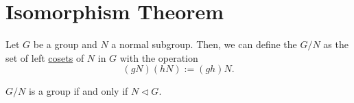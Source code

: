 \section{Isomorphism Theorem}

\begin{definition}\label{def:quotient-group}
    Let $G$ be a group and $N$ a normal subgroup. Then, we can define the  $G/N$ as the set of left \hyperref[def:coset]{cosets} of $N$ in $G$ with the operation \[
        (gN)(hN) := (gh)N.
    \]
\end{definition}



\begin{theorem}
    $G/N$ is a group if and only if $N \triangleleft G$.
\end{theorem}

